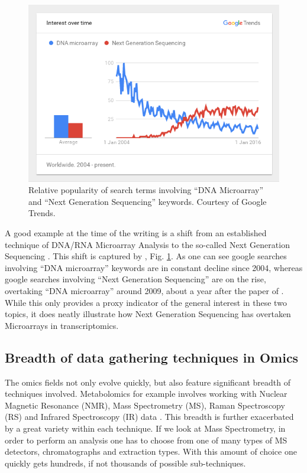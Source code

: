 \begin{figure}[ht] \label{microVsSeq}
	\centering
	\includegraphics[width=135mm]{MicroarrayVSSequencing.png}
	\caption{Relative popularity of search terms involving ``DNA Microarray'' and ``Next Generation Sequencing'' keywords. Courtesy of Google Trends.}
\end{figure}


A good example at the time of the writing is a shift from an established technique of DNA/RNA Microarray Analysis to the so-called Next Generation Sequencing \parencite{Mardis2008}. This shift is captured by \textcite{GoogleTrends}, Fig. \ref{microVsSeq}. As one can see google searches involving ``DNA microarray'' keywords are in constant decline since 2004, whereas google searches involving ``Next Generation Sequencing'' are on the rise, overtaking ``DNA microarray'' around 2009, about a year after the paper of \textcite{Mardis2008}. While this only provides a proxy indicator of the general interest in these two topics, it does neatly illustrate how Next Generation Sequencing has overtaken Microarrays in transcriptomics.

\subsection{Breadth of data gathering techniques in Omics}

The omics fields not only evolve quickly, but also feature significant breadth of techniques involved. Metabolomics for example involves working with Nuclear Magnetic Resonance (NMR), Mass Spectrometry (MS), Raman Spectroscopy (RS) and Infrared Spectroscopy (IR) data \parencite{Madsen2010}. This breadth is further exacerbated by a great variety within each technique. If we look at Mass Spectrometry, in order to perform an analysis one has to choose from one of many types of MS detectors, chromatographs and extraction types. With this amount of choice one quickly gets hundreds, if not thousands of possible sub-techniques.

